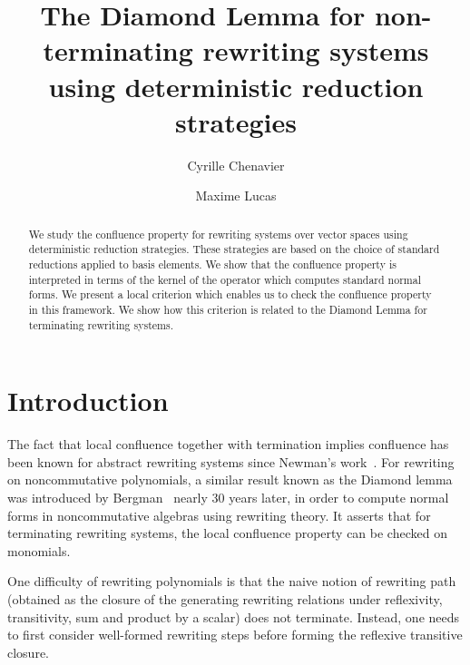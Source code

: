 \documentclass[10pt]{easychair}
\theoremstyle{definition}
\begin{document}
\title{The Diamond Lemma for non-terminating rewriting systems using deterministic reduction strategies}

\author{
Cyrille Chenavier
\and
Maxime Lucas
}



\maketitle

\begin{abstract}
  We study the confluence property for rewriting systems over vector spaces using deterministic reduction strategies. These strategies are based on the choice of standard reductions applied to basis elements. We show that the confluence property is interpreted in terms of the kernel of the operator which computes standard normal forms. We present a local criterion which enables us to check the confluence property in this framework. We show how this criterion is related to the Diamond Lemma for terminating rewriting systems.
\end{abstract}
 
\section{Introduction}

The fact that local confluence together with termination implies confluence has been known for abstract rewriting systems since Newman's work~\cite{MR0007372}. For rewriting on noncommutative polynomials, a similar result known as the Diamond lemma  was introduced by Bergman~\cite{MR506890} nearly 30 years later, in order to compute normal forms in noncommutative algebras using rewriting theory. It asserts that for terminating rewriting systems, the local confluence property can be checked on monomials. 

One difficulty of rewriting polynomials is that the naive notion of rewriting path (obtained as the closure of the generating rewriting relations under reflexivity, transitivity, sum and product by a scalar) does not terminate. Instead, one needs to first consider well-formed rewriting steps before forming the reflexive transitive closure.
\end{document}
